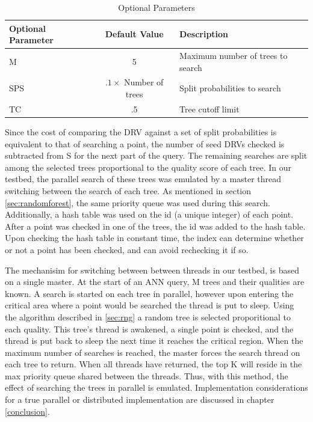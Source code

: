 \begin{table}
\centering
\begin{tabular}{ | l | c | l |}
	\hline
	Optional Parameter & Default Value & Description \\
	\hline
	M & 5 & Maximum number of trees to search \\
	\hline
	SPS & $.1 \times$ Number of trees & Split probabilities to search \\
	\hline
	TC & .5 & Tree cutoff limit \\ 
	\hline
\end{tabular}
\caption{Optional Parameters}
\label{table:annparam}
\end{table}

Since the cost of comparing the DRV against a set of split probabilities is equivalent to that of searching a point, the number of seed DRVs checked is subtracted from S for the next part of the query.  The remaining searches are split among the selected trees proportional to the quality score of each tree.  In our testbed, the parallel search of these trees was emulated by a master thread switching between the search of each tree.  As mentioned in section \ref{sec:randomforest}, the same priority queue was used during this search.  Additionally, a hash table was used on the id (a unique integer) of each point.  After a point was checked in one of the trees, the id was added to the hash table.  Upon checking the hash table in constant time, the index can determine whether or not a point has been checked, and can avoid rechecking it if so.

The mechanisim for switching between between threads in our testbed, is based on a single master.  At the start of an ANN query, M trees and their qualities are known.  A search is started on each tree in parallel, however upon entering the critical area where a point would be searched the thread is put to sleep.  Using the algorithm described in \ref{sec:rng} a random tree is selected proporitional to each quality.  This tree's thread is awakened, a single point is checked, and the thread is put back to sleep the next time it reaches the critical region.  When the maximum number of searches is reached, the master forces the search thread on each tree to return.  When all threads have returned, the top K will reside in the max priority queue shared between the threads.  Thus, with this method, the effect of searching the trees in parallel is emulated.  Implementation considerations for a true parallel or distributed implementation are discussed in chapter \ref{conclusion}.

